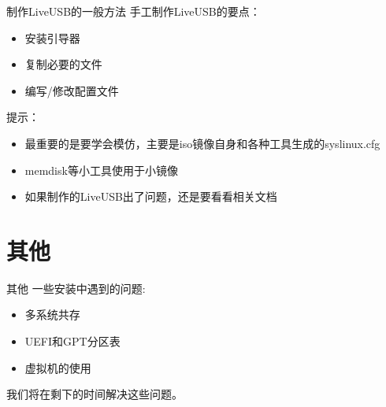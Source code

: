 \documentclass{beamer}
\begin{document}
\begin{frame}{制作LiveUSB的一般方法}
手工制作LiveUSB的要点：
\begin{itemize}
\item 安装引导器
\item 复制必要的文件
\item 编写/修改配置文件
\end{itemize}

提示：
\begin{itemize}
\item 最重要的是要学会模仿，主要是iso镜像自身和各种工具生成的syslinux.cfg
\item memdisk等小工具使用于小镜像
\item 如果制作的LiveUSB出了问题，还是要看看相关文档
\end{itemize}

\end{frame}

\section{其他}
\begin{frame}{其他}
一些安装中遇到的问题:
\begin{itemize}
\item 多系统共存
\item UEFI和GPT分区表
\item 虚拟机的使用
\end{itemize}

我们将在剩下的时间解决这些问题。
\end{frame}
\end{document}
